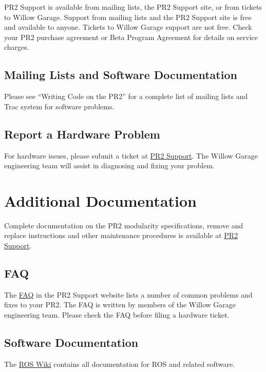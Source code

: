 PR2 Support is available from mailing lists, the PR2 Support site, or from tickets to Willow Garage. Support from mailing lists and the PR2 Support site is free and available to anyone. Tickets to Willow Garage support are not free. Check your PR2 purchase agreement or Beta Program Agreement for details on service charges.

\subsection{Mailing Lists and Software Documentation}

Please see ``Writing Code on the PR2'' for a complete list of mailing lists and Trac system for software problems.

\subsection{Report a Hardware Problem}

For hardware issues, please submit a ticket at \href{http://pr2support.willowgarage.com}{PR2 Support}. The Willow Garage engineering team will assist in diagnosing and fixing your problem.

\section{Additional Documentation}

Complete documentation on the PR2 modularity specifications, remove and replace instructions and other maintenance procedures is available at \href{http://pr2support.willowgarage.com}{PR2 Support}.

\subsection{FAQ}

The \href{http://pr2support.willowgarage.com/wiki/FAQ}{FAQ} in the PR2 Support website lists a number of common problems and fixes to your PR2. The FAQ is written by members of the Willow Garage engineering team. Please check the FAQ before filing a hardware ticket.

\subsection{Software Documentation}

The \href{http://www.ros.org/wiki}{ROS Wiki} contains all documentation for ROS and related software.

